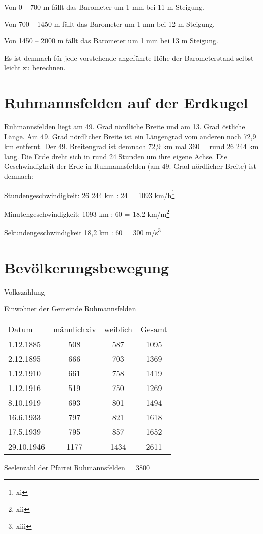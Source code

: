 \documentclass[12pt,a4paper]{book}
\begin{document}
Von 0 – 700 m fällt das Barometer um 1 mm bei 11 m Steigung.

Von 700 – 1450 m fällt das Barometer um 1 mm bei 12 m Steigung.

Von 1450 – 2000 m fällt das Barometer um 1 mm bei 13 m Steigung.

Es ist demnach für jede vorstehende angeführte Höhe der Barometerstand
selbst leicht zu berechnen.

\chapter{Ruhmannsfelden auf der Erdkugel}

Ruhmannsfelden liegt am 49. Grad nördliche Breite und am 13. Grad
östliche Länge. Am 49. Grad nördlicher Breite ist ein Längengrad vom
anderen noch 72,9 km entfernt. Der 49. Breitengrad ist demnach 72,9 km
mal 360 = rund 26 244 km lang. Die Erde dreht sich in rund 24 Stunden um
ihre eigene Achse. Die Geschwindigkeit der Erde in Ruhmannsfelden (am
49. Grad nördlicher Breite) ist demnach:

Stundengeschwindigkeit: 26 244 km : 24 = 1093 km/h\footnote{xi}

Minutengeschwindigkeit: 1093 km : 60 = 18,2 km/m\footnote{xii}

Sekundengeschwindigkeit 18,2 km : 60 = 300 m/s\footnote{xiii}

\chapter{Bevölkerungsbewegung}

Volkszählung

Einwohner der Gemeinde Ruhmannsfelden
\begin{longtable}{l|ccc}
Datum & männlichxiv & weiblich & Gesamt \\
1.12.1885 & 508 & 587 & 1095 \\
2.12.1895 & 666 & 703 & 1369 \\
1.12.1910 & 661 & 758 & 1419 \\
1.12.1916 & 519 & 750 & 1269 \\
8.10.1919 & 693 & 801 & 1494 \\
16.6.1933 & 797 & 821 & 1618 \\
17.5.1939 & 795 & 857 & 1652 \\
29.10.1946 & 1177 & 1434 & 2611 \\
\end{longtable}

Seelenzahl der Pfarrei Ruhmannsfelden = 3800
\end{document}
